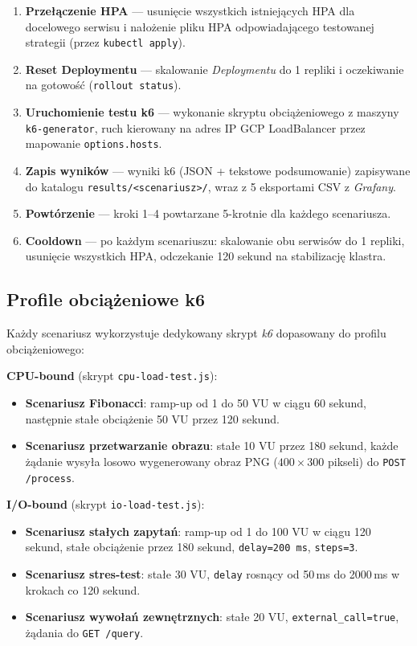 \begin{enumerate}
  \item \textbf{Przełączenie HPA} — usunięcie wszystkich istniejących HPA dla docelowego serwisu i nałożenie pliku HPA odpowiadającego testowanej strategii (przez \texttt{kubectl apply}).
  \item \textbf{Reset Deploymentu} — skalowanie \textit{Deploymentu} do 1 repliki i oczekiwanie na gotowość (\texttt{rollout status}).
  \item \textbf{Uruchomienie testu k6} — wykonanie skryptu obciążeniowego z maszyny \texttt{k6-generator}, ruch kierowany na adres IP GCP LoadBalancer przez mapowanie \texttt{options.hosts}.
  \item \textbf{Zapis wyników} — wyniki k6 (JSON + tekstowe podsumowanie) zapisywane do katalogu \texttt{results/<scenariusz>/}, wraz z 5 eksportami CSV z \textit{Grafany}.
  \item \textbf{Powtórzenie} — kroki 1--4 powtarzane 5-krotnie dla każdego scenariusza.
  \item \textbf{Cooldown} — po każdym scenariuszu: skalowanie obu serwisów do 1 repliki, usunięcie wszystkich HPA, odczekanie 120 sekund na stabilizację klastra.
\end{enumerate}

\subsection{Profile obciążeniowe k6}

Każdy scenariusz wykorzystuje dedykowany skrypt \textit{k6} dopasowany do profilu obciążeniowego:

\textbf{CPU-bound} (skrypt \texttt{cpu-load-test.js}):
\begin{itemize}
  \item \textbf{Scenariusz Fibonacci}: ramp-up od 1 do 50 VU w ciągu 60 sekund, następnie stałe obciążenie 50 VU przez 120 sekund.
  \item \textbf{Scenariusz przetwarzanie obrazu}: stałe 10 VU przez 180 sekund, każde żądanie wysyła losowo wygenerowany obraz PNG ($400 \times 300$ pikseli) do \texttt{POST /process}.
\end{itemize}

\textbf{I/O-bound} (skrypt \texttt{io-load-test.js}):
\begin{itemize}
  \item \textbf{Scenariusz stałych zapytań}: ramp-up od 1 do 100 VU w ciągu 120 sekund, stałe obciążenie przez 180 sekund, \texttt{delay=200\,ms}, \texttt{steps=3}.
  \item \textbf{Scenariusz stres-test}: stałe 30 VU, \texttt{delay} rosnący od 50\,ms do 2000\,ms w krokach co 120 sekund.
  \item \textbf{Scenariusz wywołań zewnętrznych}: stałe 20 VU, \texttt{external\_call=true}, żądania do \texttt{GET /query}.
\end{itemize}

